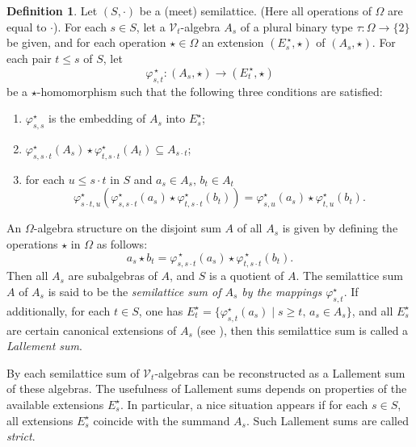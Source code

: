 \documentclass{birkau}
\def\Om{\Omega}
\newcommand{\mcV}{\mathcal{V}}
\theoremstyle{plain}
\theoremstyle{definition}
\newtheorem{definition}[theorem]{Definition}
\numberwithin{equation}{section}
\begin{document}
\begin{definition}\label{D:LS}
Let $(S, \cdot)$ be a (meet) semilattice. (Here all operations of $\Om$ are equal to
$\cdot$). For each $s \in S$, let a $\mcV_t$-algebra $A_s$ of a plural binary type
$\tau\colon \Om \rightarrow \{2\}$ be given, and for each operation $\star \in \Om$ an
extension $(E_{s}^{\,\star},\star)$ of $(A_{s},\star)$. For each pair $t \leq s$ of $S$,
let 
\begin{equation*}
\varphi_{s,t}^{\,\star}\colon (A_s, \star) \rightarrow (E_{t}^{\,\star},\star)
\end{equation*}
be a $\star$-homomorphism
such that the following three conditions are satisfied:
\begin{enumerate}
\item $\varphi_{s,s}^\star$ is the embedding of $A_s$ into $E_{s}^{\star}$;
\item $\varphi_{s,s\cdot t}^{\star}(A_s) \star \varphi_{t,s\cdot t}^{\star}(A_t) \subseteq A_{s\cdot t}$;
\item for each $u \leq s\cdot t$ in $S$ and $a_s \in A_s,\, b_t \in A_t$
  \begin{equation*}
\varphi_{s\cdot t,u}^\star (\varphi_{s,s\cdot t}^\star (a_s) \star \varphi_{t,s\cdot
  t}^\star (b_t)) = \varphi_{s,u}^\star(a_s) \star \varphi_{t,u}^\star(b_t). 
\end{equation*}
\end{enumerate}

\noindent An $\Om$-algebra structure on the disjoint sum $A$ of all $A_s$ is given by defining the operations $\star$ in $\Om$ as follows:
\begin{equation*}
a_s \star b_t = \varphi_{s,s\cdot t}^{\,\star}(a_s) \star \varphi_{t,s\cdot t}^{\,\star}(b_t).
\end{equation*}
Then all $A_s$ are subalgebras of $A$, and $S$ is a quotient of $A$. The semilattice sum
$A$ of $A_s$ is said to be the \emph{semilattice sum of $A_s$ by the mappings
  $\varphi_{s,t}^{\star}$}. If additionally, for each $t \in S$, one has
$E_{t}^\star = \{\varphi_{s,t}^{\star}(a_s) \mid s \geq t,\, a_s \in A_s\}$, and all
$E_{s}^{\star}$ are certain canonical extensions of $A_s$ (see \cite[\S~6.1]{RS85}), then
this semilattice sum is called a \emph{Lallement sum}.
\end{definition}

By \cite[Th.~624]{RS85} each semilattice sum of $\mcV_t$-algebras can be reconstructed as
a Lallement sum of these algebras. The usefulness of Lallement sums depends on properties
of the available extensions $E_{s}^\star$. In particular, a nice situation appears if for
each $s \in S$, all extensions $E_s^{\star}$ coincide with the summand $A_s$. Such
Lallement sums are called \emph{strict}.
\end{document}
